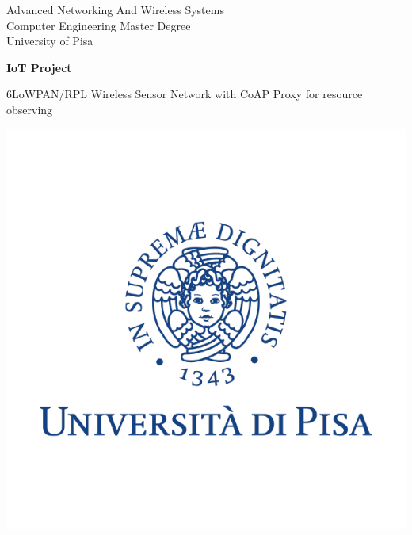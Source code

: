 \documentclass[10pt,english, openany]{book}
\begin{document}

\begin{titlepage}
	\clearpage\thispagestyle{empty}
	\centering
	\vspace{1cm}

	{\normalsize Advanced Networking And Wireless Systems \\ 
		Computer Engineering Master Degree \\
		University of Pisa \par}
		\vspace{4cm}
	{\Huge \textbf{IoT Project}} \\
	\vspace{1cm}
	{\normalsize 6LoWPAN/RPL Wireless Sensor Network with CoAP Proxy for resource observing \par}
	\vspace{4cm}
    
    \centering \includegraphics[scale=0.4]{unipi_logo.png}
    
    \vspace{0.5cm}
		
	\pagebreak

\end{titlepage}
\end{document}
